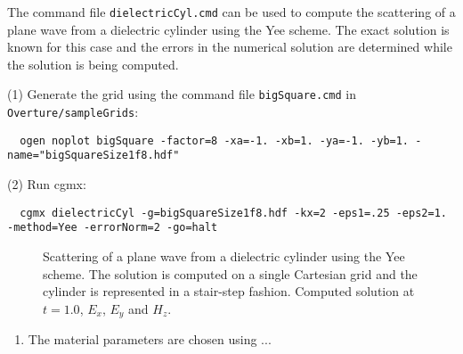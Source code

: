 \documentclass{article}
\begin{document}
The command file {\tt dielectricCyl.cmd} can be used to compute the scattering
of a plane wave from a dielectric cylinder using the Yee scheme. The exact solution is known for this case
and the errors in the numerical solution are determined while the solution
is being computed.


\noindent (1) Generate the grid using the command file {\tt bigSquare.cmd} in {\tt Overture/sampleGrids}:
{\small
\begin{verbatim}
  ogen noplot bigSquare -factor=8 -xa=-1. -xb=1. -ya=-1. -yb=1. -name="bigSquareSize1f8.hdf"
\end{verbatim}
}
\noindent (2) Run cgmx: 
\begin{verbatim}
  cgmx dielectricCyl -g=bigSquareSize1f8.hdf -kx=2 -eps1=.25 -eps2=1. -method=Yee -errorNorm=2 -go=halt
\end{verbatim}

{
\begin{figure}[hbt]
\newcommand{\figWidth}{5.5cm}
\newcommand{\trimfig}[2]{\trimFig{#1}{#2}{0.1}{0.05}{.05}{.05}}
\begin{center}
\end{center}
\caption{Scattering of a plane wave from a dielectric cylinder using the Yee scheme. The solution is
computed on a single Cartesian grid and the cylinder is represented in a stair-step fashion. 
Computed solution at $t=1.0$, $E_x$, $E_y$ and $H_z$.}
\label{fig:cyl2dDielectricScatYee}
\end{figure}
}

\begin{enumerate}
  \item The material parameters are chosen using ...
\end{enumerate}
\end{document}
